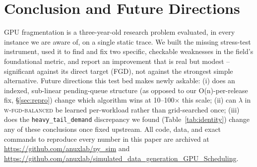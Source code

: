 \documentclass[11pt]{article}
\begin{document}
\section{Conclusion and Future Directions}
GPU fragmentation is a three-year-old research problem evaluated, in
every instance we are aware of, on a single static trace. We built the
missing stress-test instrument, used it to find and fix two specific,
checkable weaknesses in the field's foundational metric, and report an
improvement that is real but modest -- significant against its direct
target (FGD), not against the strongest simple alternative. Future
directions this test bed makes newly askable: (i) does an indexed,
sub-linear pending-queue structure (as opposed to our O(n)-per-release
fix, \S\ref{sec:repro}) change which algorithm wins at 10--100$\times$
this scale; (ii) can $\lambda$ in \textsc{w-fgd-balanced} be learned
per-workload rather than grid-searched once; (iii) does the
\texttt{heavy\_tail\_demand} discrepancy we found (Table~\ref{tab:identity})
change any of these conclusions once fixed upstream. All code, data, and
exact commands to reproduce every number in this paper are archived at
\url{https://github.com/anuxlab/py_sim} and
\url{https://github.com/anuxlab/simulated_data_generation_GPU_Scheduling}.



\end{document}
